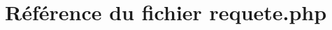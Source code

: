 \hypertarget{utilitaires_2requete_8php}{
\section{R\'{e}f\'{e}rence du fichier requete.php}
\label{utilitaires_2requete_8php}
}
